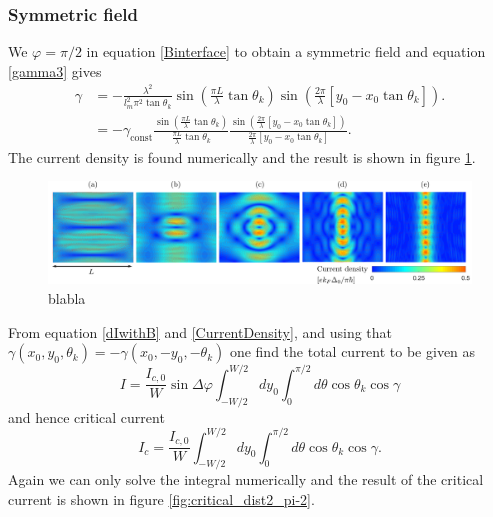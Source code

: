 \subsubsection{Symmetric field}
We $\varphi =\pi/2$ in equation \eqref{Binterface} to obtain a symmetric field and equation \eqref{gamma3} gives
\begin{equation}
\begin{split}
    \gamma &= -\frac{\lambda^2}{l_m^2\pi^2\tan\theta_k}\sin\left(\frac{\pi L}{\lambda}\tan\theta_k\right)\sin\left(\frac{2\pi}{\lambda}\left[y_0-x_0\tan\theta_k\right]\right). 
    \\
    &= -\gamma_{\mathrm{const}}\frac{\sin\left(\frac{\pi L}{\lambda}\tan\theta_k\right)}{\frac{\pi L}{\lambda}\tan\theta_k}\frac{\sin\left(\frac{2\pi}{\lambda}\left[y_0-x_0\tan\theta_k\right]\right)}{\frac{2\pi}{\lambda}\left[y_0-x_0\tan\theta_k\right]}.
\end{split}
\end{equation}
The current density is found numerically and the result is shown in figure \ref{fig:dist2_pi-2}.
\begin{figure}[hhh]
\centering
\includegraphics[width=17cm]{fig/dist2pi-2}
\caption{blabla}
\label{fig:dist2_pi-2}
\end{figure}
From equation \eqref{dIwithB} and \eqref{CurrentDensity}, and using that $\gamma(x_0,y_0,\theta_k) = -\gamma(x_0,-y_0,-\theta_k)$ one find the total current to be given as
\begin{equation}
    I = \frac{I_{c,0}}{W}\sin\Delta\varphi\int_{-W/2}^{W/2}dy_0\int_0^{\pi/2}d\theta\cos\theta_k\cos\gamma
\end{equation}
and hence critical current
\begin{equation}
    I_c = \frac{I_{c,0}}{W}\int_{-W/2}^{W/2}dy_0\int_0^{\pi/2}d\theta\cos\theta_k\cos\gamma.
\end{equation}
Again we can only solve the integral numerically and the result of the critical current is shown in figure \ref{fig:critical_dist2_pi-2}.

